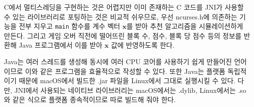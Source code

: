 C에서 멀티스레딩을 구현하는 것은 어렵지만 이미 존재하는 C 코드를 JNI가 사용할 수 있는 라이브러리로 포팅하는
것은 비교적 쉬우므로, 우선 ncurses.h에 의존하는 기능을 전부 지우고 \texttt{main} 함수를 계수 벡터
$\mathbf{x}$를 받아 추천 알고리즘을 시뮬레이션하게 만든다. 그리고 게임 오버 직전에 떨어뜨린 블록 수,
점수, 블록 당 점수 등의 정보를 반환해 Java 프로그램에서 이를 받아 $\mathbf{x}$ 값에 반영하도록 한다.

Java는 여러 스레드를 생성해 동시에 여러 CPU 코어를 사용하기 쉽게 만들어진 언어이므로
이와 같은 프로그램을 효율적으로 작성할 수 있다. 또한 Java는 플랫폼 독립적이기 때문에 macOS에서 빌드한 .jar 파일을
Linux에서 그대로 실행시킬 수 있다. 다만, JNI에서 사용되는 네이티브 라이브러리는 macOS에서는
.dylib, Linux에서는 .so와 같은 식으로 플랫폼 종속적이므로 따로 빌드해 줘야 한다.